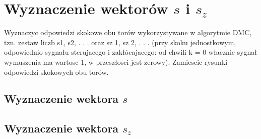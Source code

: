 \section{Wyznaczenie wektorów $s$ i $s_z$ }

Wyznaczyc odpowiedzi skokowe obu torów wykorzystywane w algorytmie DMC, tzn.
zestaw liczb s1, s2, . . . oraz sz
1, sz
2, . . . (przy skoku jednostkowym, odpowiednio sygnału
sterujacego i zakłócajacego: od chwili k = 0 włacznie sygnał wymuszenia ma wartosc
1, w przeszłosci jest zerowy). Zamiescic rysunki odpowiedzi skokowych obu torów.

\subsection{Wyznaczenie wektora $s$}

\subsection{Wyznaczenie wektora $s_z$}
